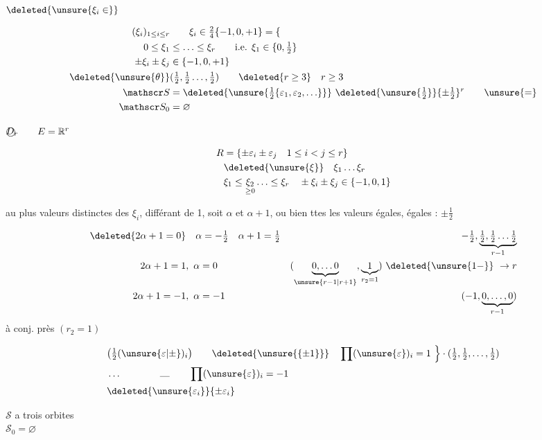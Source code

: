 \qquad $\deleted{\unsure{\xi_i\in}}$

\[
\begin{aligned}
(\xi_i)_{1\leq i\leq r}&\qquad \xi_i\in\tfrac24\{-1,0,+1\}=\{\\
0\leq\xi_1&\leq\ldots\leq\xi_r\qquad\text{i.e. }\xi_1\in\{0,\tfrac12\}\\
\pm\xi_i\pm\xi_j&\in\{-1,0,+1\}\\
\deleted{\unsure{\theta}}&(\tfrac12,\tfrac12\ldots,\tfrac12)\qquad\deleted{r\geq3}\quad r\geq3\\
\mathscr S&=\deleted{\unsure{\tfrac12\{\varepsilon_1,\varepsilon_2,\ldots\}}}\ \deleted{\unsure{\tfrac12}}\{\pm\tfrac12\}^r\qquad\unsure{=}\\
\mathscr S_0&=\varnothing
\end{aligned}
\]

$\text{\textcircled{$D_r$}}\qquad E=\mathbb R^r$

\[
\begin{aligned}
R&=\{\pm\varepsilon_i\pm\varepsilon_j\quad1\leq i<j\leq r\}\\
&\deleted{\unsure{\xi}}\quad \xi_1\ldots\xi_r\\
&\xi_1\leq\underset{\geq0}{\xi_2}\ldots\leq\xi_r\quad \pm\xi_i\pm\xi_j\in\{-1,0,1\}
\end{aligned}
\]

au plus  valeurs distinctes des $\xi_i$, différant de 1, soit $\alpha$ et $\alpha+1$,  ou bien ttes les valeurs égales, égales : $\pm\frac12$

\[
\begin{aligned}
\deleted{2\alpha+1=0}&\quad\alpha=-\tfrac12\quad\alpha+1=\tfrac12
&-\tfrac12,\underbrace{\tfrac12,\tfrac12\ldots\tfrac12}_{r-1}\\
2\alpha+1=1&,\ \alpha=0&(\underbrace{0,\ldots0}_{\unsure{r-1|r+1}},\underbrace{1}_{r_2=1})\ \deleted{\unsure{1-}}\ \to r\\
2\alpha+1=-1&,\ \alpha=-1&(-1,\underbrace{0,\ldots,0}_{r-1})
\end{aligned}
\]
\quad à conj. près $(r_2=1)$

\[
\begin{aligned}
&\bigl(\tfrac12(\unsure{\varepsilon|\pm})_i\bigr)\qquad
\deleted{\unsure{\{\pm1\}}}\quad\prod(\unsure{\varepsilon})_i=1
\ \Big\}\cdot(\tfrac12,\tfrac12,\ldots,\tfrac12)\\
&\ldots\qquad\qquad\rule{1em}{.3pt}\qquad\prod(\unsure{\varepsilon})_i=-1\\
&\deleted{\unsure{\varepsilon_i}}\{\pm\varepsilon_i\}
\end{aligned}
\]

 $\mathscr S$ a trois orbites\\ $\mathscr S_0=\varnothing$ 

